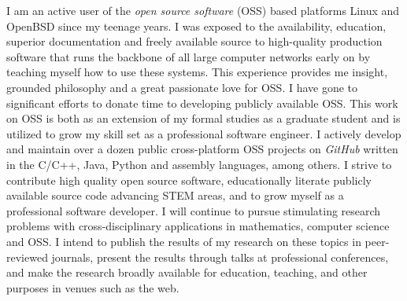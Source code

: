 \documentclass[10pt,reqno,letterpaper]{article}
\theoremstyle{plain}
\numberwithin{theorem}{section}
\theoremstyle{definition}
\begin{document}
I am an active user of the \emph{open source software} (OSS) based 
platforms Linux and OpenBSD since my 
teenage years. I was exposed to the availability, education, superior documentation and 
freely available source to high-quality production software that runs the backbone of all large 
computer networks early on by teaching myself how to use these systems. This experience provides me 
insight, grounded philosophy and a great passionate love for OSS. I have gone to significant efforts to 
donate time to developing publicly available OSS. 
This work on OSS is both as an extension of my formal studies as 
a graduate student and is utilized to grow my skill set as a professional software engineer. 
I actively develop and maintain 
over a dozen public cross-platform OSS projects on \emph{GitHub} 
written in the C/C++, Java, Python and assembly languages, among others. 
I strive to contribute high quality open source software, educationally 
literate publicly available source code advancing STEM areas, and to grow myself as a 
professional software developer. 
I will continue to pursue stimulating research problems 
with cross-disciplinary applications in mathematics, computer science and OSS. I intend to 
publish the results of my research on these topics in peer-reviewed journals, present 
the results through talks at professional conferences, and make the research broadly 
available for education, teaching, and other purposes in venues such as the web.
\end{document}
